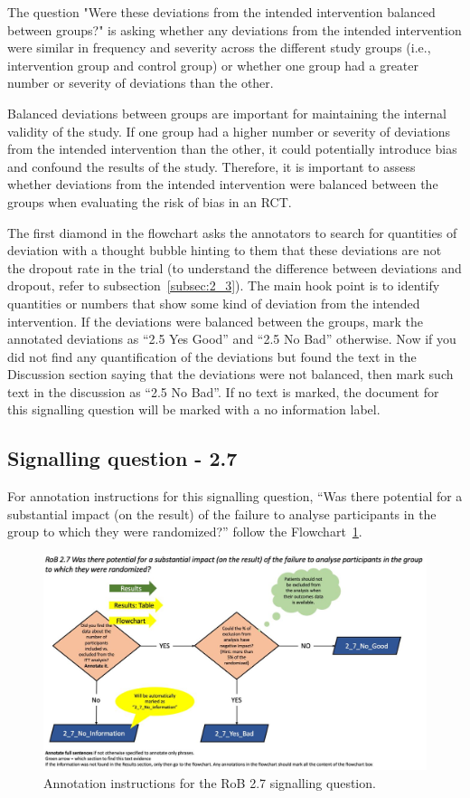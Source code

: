 \documentclass[sn-mathphys,Numbered]{sn-jnl}%
\begin{document}
The question "Were these deviations from the intended intervention balanced between groups?" is asking whether any deviations from the intended intervention were similar in frequency and severity across the different study groups (i.e., intervention group and control group) or whether one group had a greater number or severity of deviations than the other.

Balanced deviations between groups are important for maintaining the internal validity of the study. If one group had a higher number or severity of deviations from the intended intervention than the other, it could potentially introduce bias and confound the results of the study. Therefore, it is important to assess whether deviations from the intended intervention were balanced between the groups when evaluating the risk of bias in an RCT.

The first diamond in the flowchart asks the annotators to search for quantities of deviation with a thought bubble hinting to them that these deviations are not the dropout rate in the trial (to understand the difference between deviations and dropout, refer to subsection~\ref{subsec:2_3}).
The main hook point is to identify quantities or numbers that show some kind of deviation from the intended intervention.
If the deviations were balanced between the groups, mark the annotated deviations as ``2.5 Yes Good'' and ``2.5 No Bad'' otherwise.
Now if you did not find any quantification of the deviations but found the text in the Discussion section saying that the deviations were not balanced, then mark such text in the discussion as ``2.5 No Bad''.
If no text is marked, the document for this signalling question will be marked with a no information label.
%
%
%
%
\subsection*{Signalling question - 2.7 }
%
For annotation instructions for this signalling question, ``Was there potential for a substantial impact (on the result) of the failure to analyse participants in the group to which they were randomized?'' follow the Flowchart~\ref{fig:2_7}.
%
\begin{figure}[hbt]
    \centering
    \includegraphics[width=\textwidth]{figures/2_7.jpg}
    \caption{Annotation instructions for the RoB 2.7 signalling question.}
    \label{fig:2_7}
\end{figure}
\end{document}
